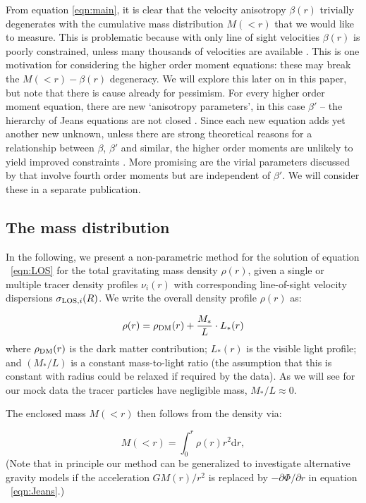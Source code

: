 From equation \ref{eqn:main}, it is clear that the velocity anisotropy
$\beta(r)$ trivially degenerates with the cumulative mass distribution $M(<r)$
that we would like to measure. This is problematic because with only line of
sight velocities $\beta(r)$ is poorly constrained, unless many thousands of
velocities are available \citep[e.g.][]{Wilkinson+2002}. This is one motivation
for considering the higher order moment equations: these may break the
$M(<r)-\beta(r)$ degeneracy. We will explore this later on in this paper, but
note that there is cause already for pessimism. For every higher order moment
equation, there are new `anisotropy parameters', in this case $\beta'$ -- the
hierarchy of Jeans equations are not closed
\citep[e.g.][]{BinneyTremaine2008}. Since each new equation adds yet another new
unknown, unless there are strong theoretical reasons for a relationship between
$\beta$, $\beta'$ and similar, the higher order moments are unlikely to yield
improved constraints \citep[e.g.][]{RichardsonFairbairn2013}. More promising are
the virial parameters discussed by \citep{RichardsonFairbairn2014} that involve
fourth order moments but are independent of $\beta'$. We will consider these in
a separate publication.

\subsection{The mass distribution}

In the following, we present a non-parametric method for the solution of
equation ~\ref{eqn:LOS} for the total gravitating mass
density $\rho(r)$, given a single or multiple tracer density profiles $\nu_i(r)$
with corresponding line-of-sight velocity dispersions
$\sigma_{\text{LOS},i}(R)$. We write
the overall density profile $\rho(r)$ as:

\begin{equation}
    \rho(r) = \rho_{\rm{DM}}(r)+ \frac{M_*}{L} \cdot L_*(r)
\end{equation}
where $\rho_{\rm{DM}}(r)$ is the dark matter contribution; $L_*(r)$ is the
visible light profile; and $(M_*/L)$ is a constant mass-to-light ratio (the
assumption that this is constant with radius could be relaxed if
required by the data). As we will see for our mock data the tracer
particles have negligible mass, $M_*/L\approx 0$.

The enclosed mass $M(<r)$ then follows from the density via:

\begin{equation}
    M(<r) = \int_0^r \rho(r) r^2 \text{d}r,
\end{equation}
(Note that in principle our method can be generalized to investigate
alternative gravity models if the acceleration $GM(r)/r^2$ is replaced
by $-\partial\Phi/\partial r$ in equation ~\ref{eqn:Jeans}.)

